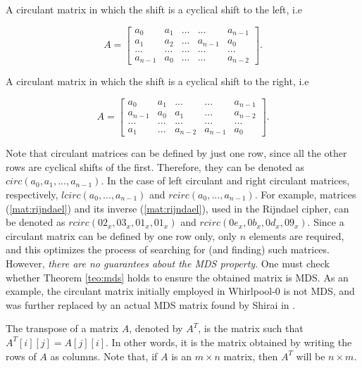 \begin{definition}
A circulant matrix in which the shift is a cyclical shift to the left, i.e

$$
A =
\begin{bmatrix}
a_0 & a_1 & ... & ... & a_{n-1}\\
a_1 & a_2 & ... & a_{n-1} & a_0\\
... & ... & ... & ... & ...\\
a_{n-1} & a_0 & ... & ... & a_{n-2}
\end{bmatrix}.
$$
\end{definition}

\begin{definition}
A circulant matrix in which the shift is a cyclical shift to the right, i.e

$$
A =
\begin{bmatrix}
a_0 & a_1 & ... & ... & a_{n-1}\\
a_{n-1} & a_0 & a_1 & ... & a_{n-2}\\
... & ... & ... & ... & ...\\
a_1 & ... & a_{n-2} & a_{n-1} & a_0
\end{bmatrix}.
$$
\end{definition}

Note that circulant matrices can be defined by just one row, since all the other rows are cyclical shifts of the first. Therefore, they can be denoted as $circ(a_0, a_1, ..., a_{n-1})$. In the case of left circulant and right circulant matrices, respectively, $lcirc(a_0, ..., a_{n-1})$ and $rcirc(a_0, ..., a_{n-1})$. For example, matrices (\ref{mat:rijndael}) and its inverse (\ref{mat:rijndael}), used in the Rijndael cipher, can be denoted as $rcirc(02_x, 03_x, 01_x, 01_x)$ and $rcirc(0e_x, 0b_x, 0d_x, 09_x)$. Since a circulant matrix can be defined by one row only, only $n$ elements are required, and this optimizes the process of searching for (and finding) such matrices. However, \emph{there are no guarantees about the MDS property}. One must check whether Theorem \ref{teo:mds} holds to ensure the obtained matrix is MDS. As an example, the circulant matrix initially employed in Whirlpool-0 \cite{Whirlpool2003} is not MDS, and was further replaced by an actual MDS matrix found by Shirai in \cite{Shirai2003}.

\begin{definition}
The transpose of a matrix $A$, denoted by $A^T$, is the matrix such that $A^T[i][j] = A[j][i]$. In other words, it is the matrix obtained by writing the rows of $A$ as columns. Note that, if $A$ is an $m \times n$ matrix, then $A^T$ will be $n \times m$.
\end{definition}

